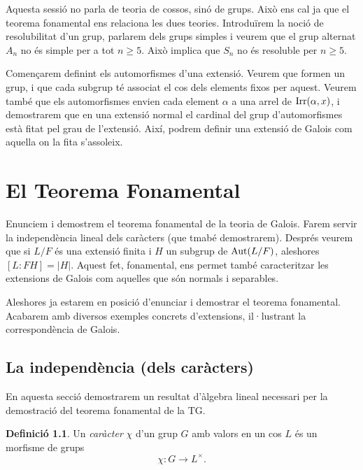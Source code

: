 \documentclass[
]{book}
\theoremstyle{definition}
\newtheorem{definition}{Definició}[chapter]
\theoremstyle{definition}
\theoremstyle{definition}
\theoremstyle{definition}
\theoremstyle{remark}
\begin{document}
Aquesta sessió no parla de teoria de cossos, sinó de grups. Això ens cal ja que el teorema fonamental ens relaciona les dues teories. Introduïrem
la noció de resolubilitat d'un grup, parlarem dels grups simples i veurem que el grup alternat \(A_n\) no és simple per a tot \(n \geq 5\). Això
implica que \(S_n\) no és resoluble per \(n\geq 5\).

Començarem definint els automorfismes d'una extensió. Veurem que formen
un grup, i que cada subgrup té associat el cos dels elements fixos per aquest. Veurem també
que els automorfismes envien cada element \(\alpha\) a una arrel de \(\operatorname{Irr}(\alpha,x)\),
i demostrarem que en una extensió normal el cardinal del grup d'automorfismes està
fitat pel grau de l'extensió. Així, podrem definir una extensió de Galois com aquella
on la fita s'assoleix.

\hypertarget{el-teorema-fonamental}{%
\chapter{El Teorema Fonamental}\label{el-teorema-fonamental}}

Enunciem i demostrem el teorema fonamental de la teoria de Galois. Farem
servir la independència lineal dels caràcters (que tmabé demostrarem). Després veurem
que si \(L / F\) és una extensió finita i \(H\) un subgrup de \(\operatorname{Aut}(L/F)\), aleshores
\([L \colon FH] = |H|\). Aquest fet, fonamental, ens permet també caracteritzar
les extensions de Galois com aquelles que són normals i separables.

Aleshores ja estarem en posició d'enunciar i demostrar el teorema fonamental. Acabarem
amb diversos exemples concrets d'extensions, il·lustrant la correspondència de Galois.

\hypertarget{la-independuxe8ncia-dels-caruxe0cters}{%
\section{La independència (dels caràcters)}\label{la-independuxe8ncia-dels-caruxe0cters}}

En aquesta secció demostrarem un resultat d'àlgebra lineal necessari per la demostració del teorema fonamental de la TG.

\begin{definition}
\protect\hypertarget{def:caracter}{}\label{def:caracter}Un \emph{caràcter} \(\chi\) d'un grup \(G\) amb valors en un cos \(L\) és un morfisme de grups
\[
\chi \colon G \to L^\times.
\]
\end{definition}
\end{document}
